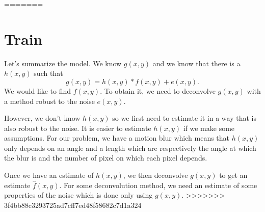 =======
\section{Train}
Let's summarize the model.
We know $g(x,y)$ and we know that there is a $h(x,y)$ such that
\[ g(x,y) = h(x,y) * f(x,y) + e(x,y). \]
We would like to find $f(x,y)$.
To obtain it, we need to deconvolve $g(x,y)$ with a method
robust to the noise $e(x,y)$.

However, we don't know $h(x,y)$ so we first need to estimate it
in a way that is also robust to the noise.
It is easier to estimate $h(x,y)$ if we make some assumptions.
For our problem, we have a motion blur which means that
$h(x,y)$ only depends on an angle and a length which are
respectively the angle at which the blur is and the number of
pixel on which each pixel depends.

Once we have an estimate of $h(x,y)$, we then deconvolve
$g(x,y)$ to get an estimate $\hat{f}(x,y)$.
For some deconvolution method, we need an estimate of
some properties of the noise which is done only using $g(x,y)$.
>>>>>>> 3f4bb88c3293725ad7cff7ed48f58682c7d1a324
